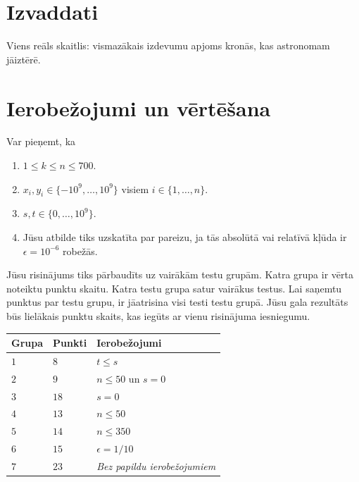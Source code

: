 \section*{Izvaddati}

Viens reāls skaitlis: vismazākais izdevumu apjoms kronās, kas astronomam jāiztērē.

\section*{Ierobežojumi un vērtēšana}

Var pieņemt, ka
\begin{enumerate}
\item $1\leq k\leq n\leq 700$. %
\item $x_i, y_i\in \{-10^9,\ldots, 10^9\}$ visiem $i\in\{1,\ldots,n\}$. %
\item $s,t\in \{0,\ldots, 10^9\}$. %
\item Jūsu atbilde tiks uzskatīta par pareizu, ja tās absolūtā vai relatīvā kļūda ir $\epsilon = 10^{-6}$ robežās.
\end{enumerate}

Jūsu risinājums tiks pārbaudīts uz vairākām testu grupām. Katra grupa ir vērta noteiktu punktu skaitu.
Katra testu grupa satur vairākus testus.
Lai saņemtu punktus par testu grupu, ir jāatrisina visi testi testu grupā.
Jūsu gala rezultāts būs lielākais punktu skaits, kas iegūts ar vienu risinājuma iesniegumu.

\medskip
\noindent
\begin{tabular}{lll}
  Grupa & Punkti & Ierobežojumi\\\hline
  $1$ & $8$ &  $t\leq s$\\
  $2$ & $9$ & $n\le 50$ un $s=0$\\
  $3$ & $18$ & $s=0$\\
  $4$ & $13$ & $n\leq 50$\\
  $5$ & $14$ & $n\leq 350$\\
  $6$ & $15$ & $\epsilon = 1/10$\\
  $7$ & $23$ & \emph{Bez papildu ierobežojumiem}\\
\end{tabular}
